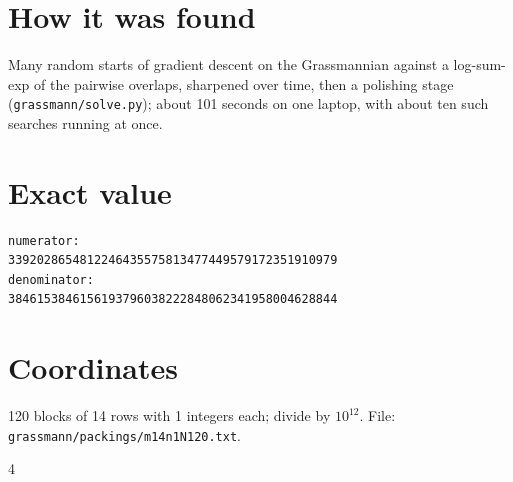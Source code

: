 \documentclass[11pt,a4paper]{article}
\begin{document}
\section{How it was found}
Many random starts of gradient descent on the Grassmannian against a log-sum-exp of the pairwise overlaps, sharpened over time, then a polishing stage (\texttt{grassmann/solve.py}); about 101 seconds on one laptop, with about ten such searches running at once.


\appendix
\section{Exact value}
{\small
\begin{verbatim}
numerator:
3392028654812246435575813477449579172351910979
denominator:
3846153846156193796038222848062341958004628844
\end{verbatim}}

\section{Coordinates}
120 blocks of 14 rows with 1 integers each; divide by $10^{12}$. File: \texttt{grassmann/packings/m14n1N120.txt}.
{\tiny
\begin{multicols}{4}
\end{multicols}}
\end{document}
